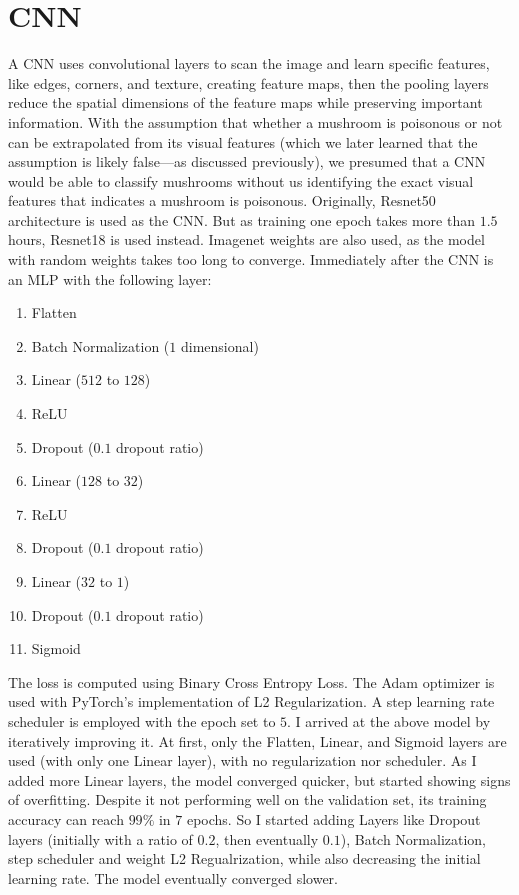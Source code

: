 \documentclass[journal]{IEEEtran}
\begin{document}
 
 
 
\section{CNN}
A CNN uses convolutional layers to scan the image and learn specific features, like edges, corners, and texture, creating feature maps, then the pooling layers reduce the spatial dimensions of the feature maps while preserving important information. With the assumption that whether a mushroom is poisonous or not can be extrapolated from its visual features (which we later learned that the assumption is likely false––as discussed previously), we presumed that a CNN would be able to classify mushrooms without us identifying the exact visual features that indicates a mushroom is poisonous.
Originally, Resnet50 architecture is used as the CNN. But as training one epoch takes more than $1.5$ hours, Resnet18 is used instead. Imagenet weights are also used, as the model with random weights takes too long to converge. Immediately after the CNN is an MLP with the following layer:
\begin{enumerate}
    \item Flatten
    \item Batch Normalization ($1$ dimensional)
    \item Linear ($512$ to $128$)
    \item ReLU
    \item Dropout ($0.1$ dropout ratio)
    \item Linear ($128$ to $32$)
    \item ReLU
    \item Dropout ($0.1$ dropout ratio)
    \item Linear ($32$ to $1$)
    \item Dropout ($0.1$ dropout ratio)
    \item Sigmoid
\end{enumerate}
The loss is computed using Binary Cross Entropy Loss. The Adam optimizer is used with PyTorch's implementation of L2 Regularization. A step learning rate scheduler is employed with the epoch set to $5$.
I arrived at the above model by iteratively improving it. At first, only the Flatten, Linear, and Sigmoid layers are used (with only one Linear layer), with no regularization nor scheduler. As I added more Linear layers, the model converged quicker, but started showing signs of overfitting. Despite it not performing well on the validation set, its training accuracy can reach $99\%$ in $7$ epochs. So I started adding Layers like Dropout layers (initially with a ratio of $0.2$, then eventually $0.1$), Batch Normalization, step scheduler and weight L2 Regualrization, while also decreasing the initial learning rate. The model eventually converged slower.
\end{document}
